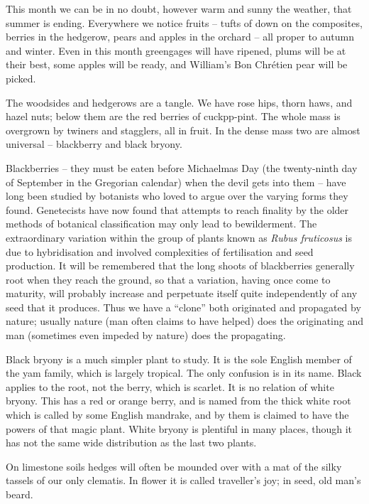 This month we can be in no doubt, however warm and sunny the weather, that summer is ending. Everywhere we notice fruits -- tufts of down on the composites, berries in the hedgerow, pears and apples in the orchard -- all proper to autumn and winter. Even in this month greengages will have ripened, plums will be at their best, some apples will be ready, and William's Bon Chr\'etien pear will be picked.

The woodsides and hedgerows are a tangle. We have rose hips, thorn haws, and hazel nuts; below them are the red berries of cuckpp-pint. The whole mass is overgrown by twiners and stagglers, all in fruit. In the dense mass two are almost universal -- blackberry and black bryony.

Blackberries -- they must be eaten before Michaelmas Day (the twenty-ninth day of September in the Gregorian calendar) when the devil gets into them -- have long been studied by botanists who loved to argue over the varying forms they found. Genetecists have now found that attempts to reach finality by the older methods of botanical classification may only lead to bewilderment. The extraordinary variation within the group of plants known as \emph{Rubus fruticosus} is due to hybridisation and involved complexities of fertilisation and seed production. It will be remembered that the long shoots of blackberries generally root when they reach the ground, so that a variation, having once come to maturity, will probably increase and perpetuate itself quite independently of any seed that it produces. Thus we have a ``clone'' both originated and propagated by nature; usually nature (man often claims to have helped) does the originating and man (sometimes even impeded by nature) does the propagating.

Black bryony is a much simpler plant to study. It is the sole English member of the yam family, which is largely tropical. The only confusion is in its name. Black applies to the root, not the berry, which is scarlet. It is no relation of white bryony. This has a red or orange berry, and is named from the thick white root which is called by some English mandrake, and by them is claimed to have the powers of that magic plant. White bryony is plentiful in many places, though it has not the same wide distribution as the last two plants.

On limestone soils hedges will often be mounded over with a mat of the silky tassels of our only clematis. In flower it is called traveller's joy; in seed, old man's beard.

